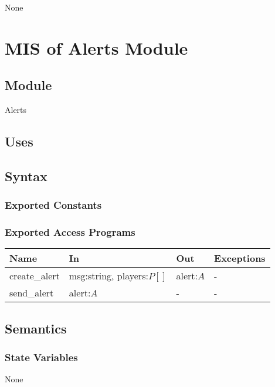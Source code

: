 \documentclass[12pt, titlepage]{article}
\begin{document}
None

\newpage

\section{MIS of Alerts Module} \label{mAL}

\subsection{Module}

Alerts

\subsection{Uses}

\subsection{Syntax}

\subsubsection{Exported Constants}

\subsubsection{Exported Access Programs}

\begin{center}
\begin{tabular}{p{3cm} p{5cm} p{2cm} p{2cm}}
\hline
\textbf{Name} & \textbf{In} & \textbf{Out} & \textbf{Exceptions} \\
\hline
create\_alert & msg:string, players:$P[]$ & alert:$A$ & - \\
send\_alert & alert:$A$ & - & - \\
\hline
\end{tabular}
\end{center}

\subsection{Semantics}

\subsubsection{State Variables}

None
\end{document}
